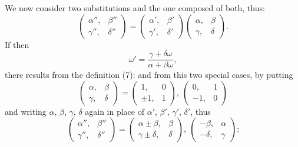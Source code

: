 
We now consider two substitutions and the one composed of both, thus:
\[
\begin{pmatrix}\alpha'', & \beta''\\ \gamma'', & \delta''\end{pmatrix} = \begin{pmatrix}\alpha', & \beta'\\ \gamma', & \delta'\end{pmatrix}\begin{pmatrix}\alpha, & \beta\\ \gamma, & \delta\end{pmatrix}.
\]
If then
\[
\omega' = \frac{\gamma+\delta\omega}{\alpha+\beta\omega},
\]
there results from the definition (7):
and from this two special cases, by putting
\[
\begin{pmatrix}\alpha, & \beta\\ \gamma, & \delta\end{pmatrix} = \begin{pmatrix}1, & 0\\ \pm 1, & 1\end{pmatrix}, \ \begin{pmatrix}0, & 1\\ -1, & 0\end{pmatrix}
\]
and writing $\alpha$, $\beta$, $\gamma$, $\delta$ again in place of $\alpha'$, $\beta'$, $\gamma'$, $\delta'$, thus
\[
\begin{pmatrix}\alpha'', & \beta''\\ \gamma'', & \delta''\end{pmatrix} = \begin{pmatrix}\alpha\pm\beta, & \beta\\ \gamma\pm\delta, & \delta\end{pmatrix}, \ \begin{pmatrix}-\beta, & \alpha\\ -\delta, & \gamma\end{pmatrix}\text{:}
\]
